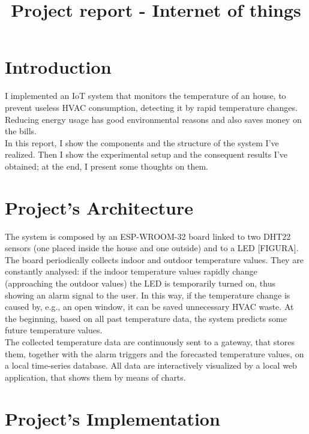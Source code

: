 \documentclass[conference]{IEEEtran}
\begin{document}
\title{Project report - Internet of things}

\author{
}

\maketitle


\section{Introduction}
I implemented an IoT system that monitors the temperature of an house, to prevent useless HVAC consumption, detecting it by rapid temperature changes. Reducing energy usage has good environmental reasons and also saves money on the bills.\\
In this report, I show the components and the structure of the system I've realized. Then I show the experimental setup and the consequent results I've obtained; at the end, I present some thoughts on them.


\section{Project’s Architecture}
The system is composed by an ESP-WROOM-32 board linked to two DHT22 sensors (one placed inside the house and one outside) and to a LED [FIGURA].\\
The board periodically collects indoor and outdoor temperature values. They are constantly analysed: if the indoor temperature values rapidly change (approaching the outdoor values) the LED is temporarily turned on, thus showing an alarm signal to the user. In this way, if the temperature change is caused by, e.g., an open window, it can be saved unnecessary HVAC waste. At the beginning, based on all past temperature data, the system predicts some future temperature values.\\
The collected temperature data are continuously sent to a gateway, that stores them, together with the alarm triggers and the forecasted temperature values, on a local time-series database. All data are interactively visualized by a local web application, that shows them by means of charts.


\section{Project’s Implementation}
\end{document}
